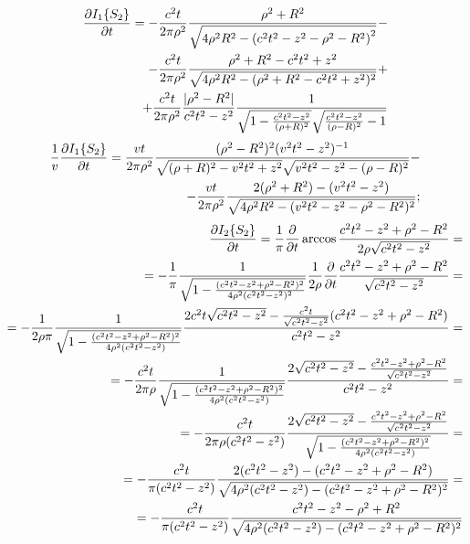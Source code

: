 %
\textcolor{blue}{ \begin{equation*} \begin{aligned}
\frac{\partial  I_1 \{ S_2 \} }{\partial t} = - \frac{c^2 t}{2 \pi \rho^2}
\frac{\rho^2 + R^2}
{ \sqrt{4 \rho^2 R^2 - \left(c^2 t^2 - z^2 - \rho^2 - R^2 \right)^2} } - \\
- \frac{c^2 t}{2 \pi \rho^2} \frac{\rho^2 + R^2 - c^2 t^2 + z^2}
{ \sqrt{4 \rho^2 R^2 - (\rho^2 + R^2 - c^2t^2 + z^2)^2} } + \\ 
+ \frac{ c^2 t }{2 \pi \rho^2} \frac{|\rho^2 - R^2|}{ c^2 t^2 - z^2 } \frac{1} 
{ \sqrt{ 1 - \frac{c^2t^2 - z^2}{(\rho + R)^2 } } 
\sqrt{ \frac{c^2t^2 - z^2}{ (\rho - R)^2 } - 1} }
\end{aligned} \end{equation*} }
%
\begin{equation} \begin{aligned} \label{eq:i1_partder}
\frac{1}{v} \frac{\partial  I_1 \{ S_2 \} }{\partial t} = \frac{ vt }{2 \pi \rho^2} 
\frac{ (\rho^2 - R^2)^2  (v^2 t^2 - z^2)^{-1} } 
{ \sqrt{ (\rho + R)^2 - v^2t^2 + z^2 } 
\sqrt{ v^2t^2 - z^2 - (\rho - R)^2 } } - \\
- \frac{vt}{2 \pi \rho^2} \frac{2 (\rho^2 + R^2) - (v^2 t^2 - z^2)}
{ \sqrt{4 \rho^2 R^2 - (v^2t^2 - z^2 - \rho^2 - R^2)^2} };
\end{aligned} \end{equation}
%
\textcolor{blue}{ \begin{equation*} \begin{aligned}
\frac{\partial  I_2 \{ S_2 \} }{\partial t} = \frac{1}{\pi} \frac{\partial }{\partial t} \arccos 
\frac{c^2t^2 - z^2 + \rho^2 - R^2}{2 \rho \sqrt{c^2t^2 - z^2}} = \\
= - \frac{1}{\pi} \frac{1} { \sqrt{ 1 - \frac{ (c^2t^2 - z^2 + \rho^2 - R^2)^2 }
{4 \rho^2 (c^2t^2 - z^2)^2} } } \frac{1}{2 \rho} \frac{\partial }{\partial t} 
\frac{c^2t^2 - z^2 + \rho^2 - R^2} {\sqrt{c^2t^2 - z^2}} = \\
= - \frac{1}{2 \rho \pi} \frac{1} 
{ \sqrt{ 1 - \frac{ (c^2t^2 - z^2 + \rho^2 - R^2)^2 }
{4 \rho^2 (c^2t^2 - z^2)} } } \frac{2c^2t \sqrt{c^2t^2 - z^2} - 
\frac{c^2t}{\sqrt{c^2t^2 - z^2}} (c^2t^2 - z^2 + \rho^2 - R^2)
}{c^2t^2 - z^2} = \\ = - \frac{c^2 t}{2 \pi \rho} \frac{1} 
{ \sqrt{ 1 - \frac{ (c^2t^2 - z^2 + \rho^2 - R^2)^2 }
{4 \rho^2 (c^2t^2 - z^2)} } } \frac{2 \sqrt{c^2t^2 - z^2} - 
\frac{c^2t^2 - z^2 + \rho^2 - R^2}{\sqrt{c^2t^2 - z^2}}}{c^2t^2 - z^2} = \\
= - \frac{c^2 t}{2 \pi \rho (c^2t^2 - z^2)} \frac{ 2 \sqrt{c^2t^2 - z^2} - 
\frac{c^2t^2 - z^2 + \rho^2 - R^2}{\sqrt{c^2t^2 - z^2}} } 
{ \sqrt{ 1 - \frac{ (c^2t^2 - z^2 + \rho^2 - R^2)^2 }
{4 \rho^2 (c^2t^2 - z^2)} } } = \\
= - \frac{c^2 t}{\pi (c^2t^2 - z^2) } 
\frac{ 2 (c^2t^2 - z^2) - (c^2t^2 - z^2 + \rho^2 - R^2) } 
{ \sqrt{ 4 \rho^2 (c^2t^2 - z^2) - (c^2t^2 - z^2 + \rho^2 - R^2)^2 } } = \\
= - \frac{c^2 t}{\pi (c^2t^2 - z^2) } \frac{ c^2t^2 - z^2 -  \rho^2 + R^2 } 
{ \sqrt{ 4 \rho^2 (c^2t^2 - z^2) - (c^2t^2 - z^2 + \rho^2 - R^2)^2 } }
\end{aligned} \end{equation*} }

